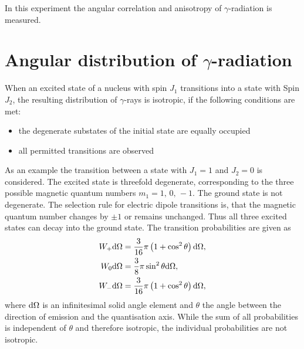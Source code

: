 In this experiment the angular correlation and anisotropy of $\gamma$-radiation is measured.

\section{Angular distribution of $\gamma$-radiation}

When an excited state of a nucleus with spin $J_{1}$ transitions into a state with Spin $J_{2}$, the resulting distribution of $\gamma$-rays is isotropic, if the following conditions are met:
\begin{itemize}
 \item the degenerate substates of the initial state are equally occupied
 \item all permitted transitions are observed
\end{itemize}
As an example the transition between a state with $J_{1}=1$ and $J_{2}=0$ is considered. The excited state is threefold degenerate, corresponding to the three possible magnetic quantum numbers $m_{1}=1,\,0,\,-1$. The ground state is not degenerate.
The selection rule for electric dipole transitions is, that the magnetic quantum number changes by $\pm1$ or remains unchanged. Thus all three excited states can decay into the ground state. The transition probabilities are given as \cite{BB} 
\begin{align}
 W_{+} \text{d}\Omega &= \frac{3}{16}\pi\left(1+\cos^{2}\theta\right)\text{d}\Omega, \\
 W_{0} \text{d}\Omega &= \frac{3}{8}\pi\sin^{2}\theta\text{d}\Omega, \\
 W_{-} \text{d}\Omega &= \frac{3}{16}\pi\left(1+\cos^{2}\theta\right)\text{d}\Omega,
\end{align}
where $\text{d}\Omega$ is an infinitesimal solid angle element and $\theta$ the angle between the direction of emission and the quantisation axis.
While the sum of all probabilities is independent of $\theta$ and therefore isotropic, the individual probabilities are not isotropic.

